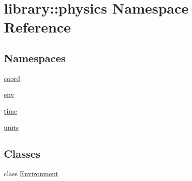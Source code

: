 \hypertarget{namespacelibrary_1_1physics}{}\section{library\+:\+:physics Namespace Reference}
\label{namespacelibrary_1_1physics}
\subsection*{Namespaces}
\begin{DoxyCompactItemize}
\item 
 \hyperlink{namespacelibrary_1_1physics_1_1coord}{coord}
\item 
 \hyperlink{namespacelibrary_1_1physics_1_1env}{env}
\item 
 \hyperlink{namespacelibrary_1_1physics_1_1time}{time}
\item 
 \hyperlink{namespacelibrary_1_1physics_1_1units}{units}
\end{DoxyCompactItemize}
\subsection*{Classes}
\begin{DoxyCompactItemize}
\item 
class \hyperlink{classlibrary_1_1physics_1_1_environment}{Environment}
\end{DoxyCompactItemize}
